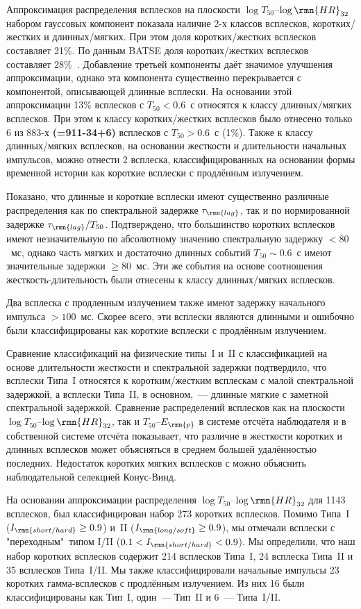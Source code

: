 Аппроксимация распределения всплесков на плоскости $\log T_{50}$--$\log \rmn{HR}_{32}$ 
набором гауссовых компонент показала наличие 2-х классов всплесков, коротких/жестких 
и длинных/мягких. При этом доля коротких/жестких всплесков составляет 21\%. По данным 
BATSE доля коротких/жестких всплесков составляет 28\%~\citep{Horvath_2002}.  
Добавление третьей компоненты даёт значимое улучшения аппроксимации, однако эта 
компонента существенно перекрывается с  компонентой, описывающей длинные всплески. 
На основании этой аппроксимации 13\% всплесков с $T_{50} < 0.6$~с относятся к классу 
длинных/мягких всплесков. При этом к классу коротких/жестких всплесков было отнесено 
только 6 из 883-х \textbf{(=911-34+6)} всплесков с $T_{50} >0.6$~с (1\%). 
Также к классу длинных/мягких всплесков, на основании жесткости и длительности 
начальных импульсов, можно отнести 2 всплеска, классифицированных на основании формы 
временной истории как короткие всплески с продлённым излучением. 

Показано, что длинные и короткие всплески имеют существенно различные распределения 
как по спектральной задержке $\tau_{\rmn{lag}}$, так и по нормированной задержке 
$\tau_{\rmn{lag}} / T_{50}$. Подтверждено, что большинство коротких всплесков 
имеют незначительную по абсолютному значению спектральную задержку $< 80$~мс, 
однако часть мягких и достаточно длинных событий $T_{50}\sim 0.6$~с имеют 
значительные задержки $\geq 80$~мс. Эти же события на основе соотношения 
жесткость-длительность были отнесены к классу длинных/мягких всплесков. 

Два всплеска с продленным излучением также имеют задержку начального импульса $> 100$~мс. 
Скорее всего, эти всплески являются длинными и ошибочно были классифицированы 
как короткие всплески с продлённым излучением.  

Сравнение классификаций на физические типы~I и~II с классификацией на основе 
длительности жесткости и спектральной задержки подтвердило, что всплески Типа~I 
относятся к коротким/жестким всплескам с малой спектральной задержкой, а всплески 
Типа~II, в основном,~--- длинные мягкие с заметной спектральной задержкой. Сравнение 
распределений всплесков как на плоскости $\log T_{50}$--$\log \rmn{HR}_{32}$, 
так и $T_{50}$--$E_{\rmn{p}}$ в системе отсчёта наблюдателя и в собственной системе 
отсчёта показывает, что различие в жесткости коротких и длинных всплесков может 
объясняться в среднем большей удалённостью последних. Недостаток коротких мягких 
всплесков с можно объяснить наблюдательной селекцией Конус-Винд.

На основании аппроксимации распределения $\log T_{50}$--$\log \rmn{HR}_{32}$ 
для 1143 всплесков, был классифицирован набор 273 коротких всплесков. 
Помимо Типа~I ($I_{\rmn{short/hard}} \geq 0.9$) и~II ($I_{\rmn{long/soft}} \geq 0.9$), 
мы отмечали всплески с "переходным"\ типом I/II ($0.1 < I_{\rmn{short/hard}} < 0.9$). 
Мы определили, что наш набор коротких всплесков содержит 214 всплесков Типа~I, 24 всплеска Типа~II 
и 35 всплесков Типа~I/II. Мы также классифицировали начальные импульсы 23 коротких 
гамма-всплесков с продлённым излучением. Из них 16 были классифицированы как Тип~I, 
один~--- Тип~II и 6~--- Типа~I/II.

\clearpage